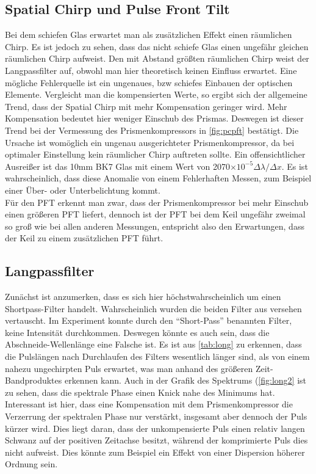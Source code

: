 \documentclass[twoside,        %
               BCOR12mm,       %
               english,ngerman, %
               fleqn,headsepline=false,footsepline=false
              ]{Vorlage/MFPREPORT}
\begin{document}
\subsection{Spatial Chirp und Pulse Front Tilt}
Bei dem schiefen Glas erwartet man als zusätzlichen Effekt einen räumlichen
Chirp. Es ist jedoch zu sehen, dass das nicht schiefe Glas einen ungefähr
gleichen räumlichen Chirp aufweist. Den mit Abstand größten räumlichen Chirp
weist der Langpassfilter auf, obwohl man hier theoretisch keinen Einfluss
erwartet. Eine mögliche Fehlerquelle ist ein ungenaues, bzw schiefes Einbauen
der optischen Elemente. Vergleicht man die kompensierten Werte, so ergibt sich
der allgemeine Trend, dass der Spatial Chirp mit mehr Kompensation geringer
wird. Mehr Kompensation bedeutet hier weniger Einschub des Prismas. Deswegen
ist dieser Trend bei der Vermessung des Prismenkompressors in \cref{fig:pcpft}
bestätigt. Die Ursache ist womöglich ein ungenau ausgerichteter
Prismenkompressor, da bei optimaler Einstellung kein räumlicher Chirp auftreten
sollte. Ein offensichtlicher Ausreißer ist das 10\;mm BK7 Glas mit einem
Wert von 2070$\times10^{-5}\Delta\lambda/\Delta x$. Es ist wahrscheinlich, dass
diese Anomalie von einem Fehlerhaften Messen, zum Beispiel einer Über- oder
Unterbelichtung kommt.\\
Für den PFT erkennt man zwar, dass der Prismenkompressor bei mehr Einschub
einen größeren PFT liefert, dennoch ist der PFT bei dem Keil ungefähr zweimal
so groß wie bei allen anderen Messungen, entspricht also den Erwartungen, dass
der Keil zu einem zusätzlichen PFT führt.
\subsection{Langpassfilter}
Zunächst ist anzumerken, dass es sich hier höchstwahrscheinlich um einen
Shortpass-Filter handelt. Wahrscheinlich wurden die beiden Filter aus versehen
vertauscht. Im Experiment konnte durch den ``Short-Pass'' benannten Filter,
keine Intensität durchkommen. Deswegen könnte es auch sein, dass die
Abschneide-Wellenlänge eine Falsche ist. Es ist aus \cref{tab:long} zu
erkennen, dass die Pulslängen nach Durchlaufen des Filters wesentlich länger
sind, als von einem nahezu ungechirpten Puls erwartet, was man anhand des
größeren Zeit-Bandproduktes erkennen kann. Auch in der Grafik des Spektrums
(\cref{fig:long2} ist zu sehen, dass die spektrale Phase einen Knick nahe des
Minimums hat. Interessant ist hier, dass eine Kompensation mit dem
Prismenkompressor die Verzerrung der spektralen Phase nur verstärkt, insgesamt
aber dennoch der Puls kürzer wird. Dies liegt daran, dass der unkompensierte
Puls einen relativ langen Schwanz auf der positiven Zeitachse besitzt, während
der komprimierte Puls dies nicht aufweist. Dies könnte zum Beispiel ein Effekt
von einer Dispersion höherer Ordnung sein.
\end{document}

